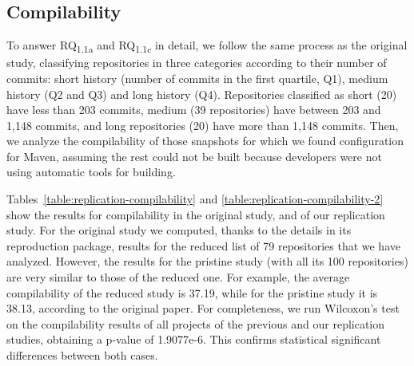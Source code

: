 \subsection{Compilability}

To answer RQ\textsubscript{1.1a} and RQ\textsubscript{1.1c} in detail, we follow the same process as the original study, classifying repositories in three categories according to their number of commits: short history (number of commits in the first quartile, Q1), medium history (Q2 and Q3) and long history (Q4). Repositories classified as short (20) have less than 203 commits, medium (39 repositories) have between 203 and 1,148 commits, and long repositories (20) have more than 1,148 commits. Then, we analyze the compilability of those snapshots for which we found configuration for Maven, assuming the rest could not be built because developers were not using automatic tools for building.

Tables~\ref{table:replication-compilability} and \ref{table:replication-compilability-2} show the results for compilability in the original study, and of our replication study. For the original study we computed, thanks to the details in its reproduction package, results for the reduced list of 79 repositories that we have analyzed. However, the results for the pristine study (with all its 100 repositories) are very similar to those of the reduced one. For example, the average compilability of the reduced study is 37.19, while for the pristine study it is 38.13, according to the original paper. For completeness, we run Wilcoxon's test on the compilability results of all projects of the previous and our replication studies, obtaining a p-value of 1.9077e-6. This confirms statistical significant differences between both cases.

